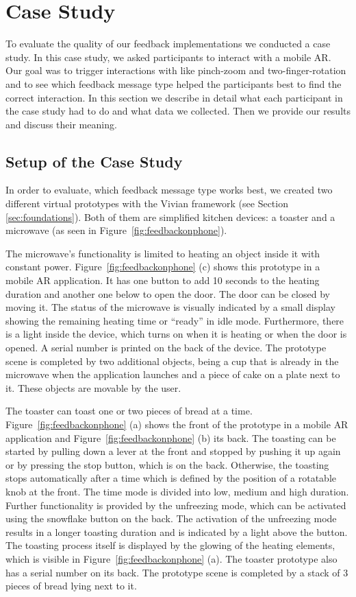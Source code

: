 \documentclass[manuscript]{acmart}
\begin{document}
	\section{Case Study}\label{sec:casestudy}
		To evaluate the quality of our feedback implementations we conducted a case study. In this case study, we asked participants to interact with a mobile AR. Our goal was to trigger interactions with like pinch-zoom and two-finger-rotation and to see which feedback message type helped the participants best to find the correct interaction. In this section we describe in detail what each participant in the case study had to do and what data we collected. Then we provide our results and discuss their meaning.
		
		\subsection{Setup of the Case Study}\label{ssec:setup}
			In order to evaluate, which feedback message type works best, we created two different virtual prototypes with the Vivian framework (see Section \ref{sec:foundations}). Both of them are simplified kitchen devices: a toaster and a microwave (as seen in Figure~\ref{fig:feedbackonphone}).

			The microwave's functionality is limited to heating an object inside it with constant power. Figure~\ref{fig:feedbackonphone} (c) shows this prototype in a mobile \ac{AR} application. It has one button to add 10 seconds to the heating duration and another one below to open the door. The door can be closed by moving it. The status of the microwave is visually indicated by a small display showing the remaining heating time or ``ready'' in idle mode. Furthermore, there is a light inside the device, which turns on when it is heating or when the door is opened. A serial number is printed on the back of the device. The prototype scene is completed by two additional objects, being a cup that is already in the microwave when the application launches and a piece of cake on a plate next to it. These objects are movable by the user.

			The toaster can toast one or two pieces of bread at a time. Figure~\ref{fig:feedbackonphone} (a) shows the front of the prototype in a mobile \ac{AR} application and Figure~\ref{fig:feedbackonphone} (b) its back. The toasting can be started by pulling down a lever at the front and stopped by pushing it up again or by pressing the stop button, which is on the back. Otherwise, the toasting stops automatically after a time which is defined by the position of a rotatable knob at the front. The time mode is divided into low, medium and high duration. Further functionality is provided by the unfreezing mode, which can be activated using the snowflake button on the back. The activation of the unfreezing mode results in a longer toasting duration and is indicated by a light above the button. The toasting process itself is displayed by the glowing of the heating elements, which is visible in Figure~\ref{fig:feedbackonphone} (a). The toaster prototype also has a serial number on its back. The prototype scene is completed by a stack of 3 pieces of bread lying next to it. 
			
\end{document}
